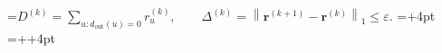 \documentclass[11pt]{article}
\begin{document}
=\hbox{$\displaystyle D^{(k)}=\sum_{u:d_{\mathrm{out}}(u)=0}r_u^{(k)},\qquad \Delta^{(k)}=\left\|\mathbf{r}^{(k+1)}-\mathbf{r}^{(k)}\right\|_1\leq\varepsilon.$}
\pdfpagewidth=\dimexpr{}+4pt\relax
\pdfpageheight=\dimexpr{}++4pt\relax
\hoffset=-1in
\voffset=-1in
\shipout\vbox{\kern2pt\hbox{\kern2pt\kern2pt}\kern2pt}
\end{document}
